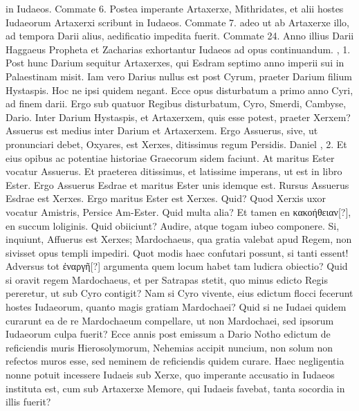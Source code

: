in Iudaeos.
Commate 6.
Postea imperante Artaxerxe, Mithridates,
et alii hostes Iudaeorum Artaxerxi scribunt in Iudaeos.
Commate 7.
adeo ut ab Artaxerxe illo, ad tempora Darii alius, aedificatio impedita
fuerit.
Commate 24.
Anno illius Darii Haggaeus Propheta
et Zacharias exhortantur Iudaeos ad opus continuandum.
, 1.
Post hunc Darium sequitur Artaxerxes, qui Esdram septimo anno
imperii sui in Palaestinam misit.
Iam vero Darius nullus est post Cyrum,
praeter Darium filium Hystaspis.
Hoc ne ipsi quidem negant.
Ecce opus disturbatum a primo anno Cyri, ad finem darii.
Ergo sub quatuor Regibus disturbatum, Cyro, Smerdi, Cambyse,
Dario.
Inter Darium Hystaspis, et Artaxerxem, quis esse potest,
praeter Xerxem?
Assuerus est medius inter Darium et Artaxerxem.
Ergo Assuerus, sive, ut pronunciari debet, Oxyares,
 est Xerxes, ditissimus
regum Persidis.
Daniel , 2.
Et eius opibus ac potentiae historiae
Graecorum sidem faciunt.
At maritus Ester vocatur Assuerus.
Et praeterea ditissimus, et latissime imperans, ut est in libro
Ester.
Ergo Assuerus Esdrae et maritus Ester unis idemque est.
Rursus Assuerus Esdrae est Xerxes.
Ergo maritus Ester est Xerxes.
Quid?
Quod Xerxis uxor vocatur Amistris, Persice Am-Ester.
Quid multa alia?
Et tamen en \textgreek{κακοήθειαν[?]}, en succum loliginis.
Quid obiiciunt?
Audire, atque togam iubeo componere.
Si, inquiunt, Affuerus est Xerxes;
Mardochaeus, qua gratia valebat apud Regem, non sivisset opus
templi impediri.
Quot modis haec confutari possunt, si tanti essent!
Adversus tot \textgreek{ἐναργῆ[?]} argumenta quem locum
 habet tam ludicra obiectio?
Quid si oravit regem Mardochaeus, et per Satrapas stetit, quo
minus edicto Regis pereretur, ut sub Cyro contigit?
Nam si Cyro vivente,
eius edictum flocci fecerunt hostes Iudaeorum, quanto magis
gratiam Mardochaei?
Quid si ne Iudaei quidem curarunt ea de re Mardochaeum
compellare, ut non Mardochaei, sed ipsorum Iudaeorum
culpa fuerit?
Ecce  annis post emissum a Dario Notho edictum
de reficiendis muris Hierosolymorum, Nehemias accipit nuncium,
non solum non refectos muros esse, sed neminem de reficiendis
quidem curare.
Haec negligentia nonne potuit incessere Iudaeis sub
Xerxe, quo imperante accusatio in Iudaeos instituta est, cum sub Artaxerxe
Memore, qui Iudaeis favebat, tanta socordia in illis fuerit?
